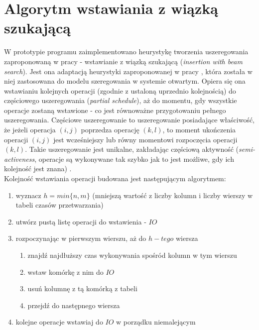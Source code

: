 \documentclass[brudnopis]{xmgr}
\begin{document}
\chapter{Algorytm wstawiania z wiązką szukającą}

W prototypie programu zaimplementowano heurystykę tworzenia uszeregowania zaproponowaną w pracy \cite{grinshpoun2014partially} - wstawianie z wiązką szukającą (\emph{insertion with beam search}).
Jest ona adaptacją heurystyki zaproponowanej w pracy \cite{brasel1993constructive}, która została w niej zastosowana do modelu szeregowania w systemie otwartym.
Opiera się ona wstawianiu kolejnych operacji (zgodnie z ustaloną uprzednio kolejnością) do częściowego uszeregowania (\emph{partial schedule}), aż do momentu, gdy wszystkie operacje zostaną wstawione - co jest równoważne przygotowaniu pełnego uszeregowania. Częściowe uszeregowanie to uszeregowanie posiadające właściwość, że jeżeli operacja $(i,j)$ poprzedza operację $(k,l)$, to moment ukończenia operacji $(i,j)$ jest wcześniejszy lub równy momentowi rozpoczęcia operacji $(k,l)$. Takie uszeregowanie jest unikalne, zakładając częściową aktywność (\emph{semi-activeness}, operacje są wykonywane tak szybko jak to jest możliwe, gdy ich kolejność jest znana) \cite{grinshpoun2014partially}.\\

Kolejność wstawiania operacji budowana jest następującym algorytmem:
\begin{enumerate}
    \item wyznacz $h = min\{n, m\}$ (mniejszą wartość z liczby kolumn i liczby wierszy w tabeli czasów przetwarzania)
    \item utwórz pustą listę operacji do wstawienia - $IO$
    \item rozpoczynając w pierwszym wierszu, aż do $h-tego$ wiersza
    \begin{enumerate}
        \item znajdź najdłuższy czas wykonywania spośród kolumn w tym wierszu
        \item wstaw komórkę z nim do $IO$
        \item usuń kolumnę z tą komórką z tabeli
        \item przejdź do następnego wiersza
    \end{enumerate}
    \item kolejne operacje wstawiaj do $IO$ w porządku niemalejącym
\end{enumerate}
\end{document}
